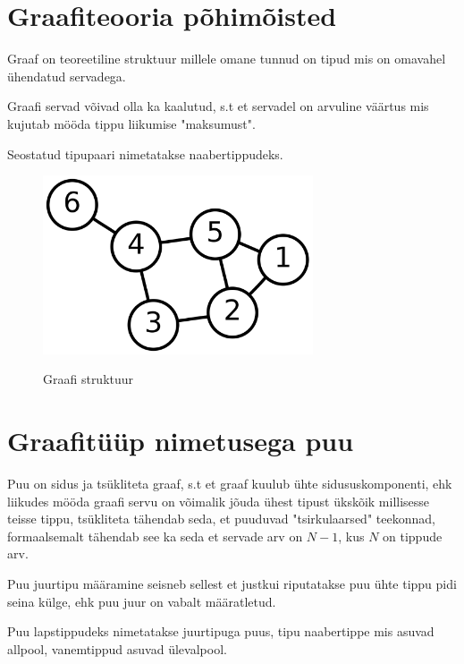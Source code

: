 \documentclass{trkut}
\theoremstyle{definition}
\begin{document}
\begin{appendices}

    \chapter{Graafiteooria põhimõisted}\label{lisa1}
    \normalsize
    Graaf on teoreetiline struktuur millele omane tunnud on tipud mis on omavahel ühendatud servadega.
    
    Graafi servad võivad olla ka kaalutud, s.t et servadel on arvuline väärtus mis kujutab mööda tippu liikumise "maksumust".

    Seostatud tipupaari nimetatakse naabertippudeks. \parencite{graaf}
    
    \begin{figure}[H]%
    \includegraphics[width=8cm]{graaf.png}%
    \caption{Graafi struktuur}%
    \label{graaf}%
    \end{figure}



    \chapter{Graafitüüp nimetusega puu}\label{lisa2}
    \tiny
    \normalsize

    Puu on sidus ja tsükliteta graaf, s.t et graaf kuulub ühte sidususkomponenti, ehk liikudes mööda graafi servu on võimalik jõuda ühest tipust ükskõik millisesse teisse tippu, tsükliteta tähendab seda, et puuduvad "tsirkulaarsed" teekonnad, formaalsemalt tähendab see ka seda et servade arv on $N-1$, kus $N$ on tippude arv.

    Puu juurtipu määramine seisneb sellest et justkui riputatakse puu ühte tippu pidi seina külge, ehk puu juur on vabalt määratletud.

    Puu lapstippudeks nimetatakse juurtipuga puus, tipu naabertippe mis asuvad allpool, vanemtippud asuvad ülevalpool. \parencite{puu}
   

\end{appendices}
\end{document}
